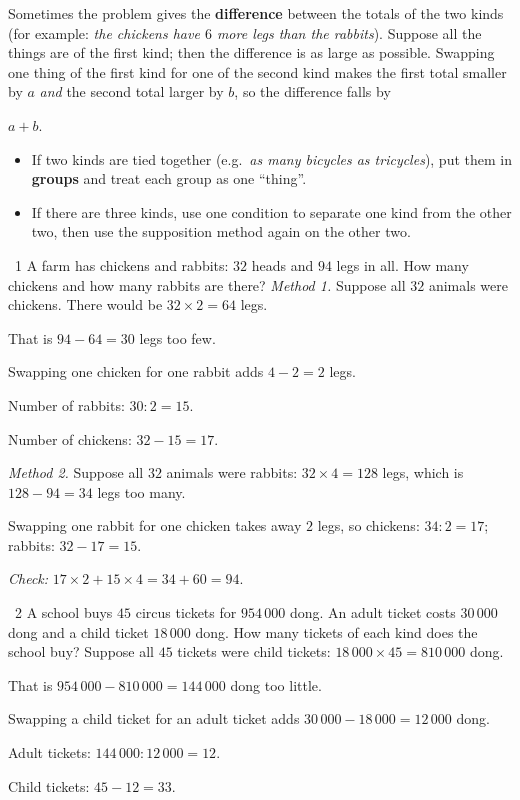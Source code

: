 \begin{knowbox}
Sometimes the problem gives the \textbf{difference} between the totals of the two kinds (for example: \emph{the chickens have $6$ more legs than the rabbits}). Suppose all the things are of the first kind; then the difference is as large as possible. Swapping one thing of the first kind for one of the second kind makes the first total smaller by $a$ \emph{and} the second total larger by $b$, so the difference falls by
\begin{center}
$a+b$.
\end{center}
\end{knowbox}

\begin{knowbox}
\begin{itemize}[leftmargin=1.4em,itemsep=3pt]
\item If two kinds are tied together (e.g.\ \emph{as many bicycles as tricycles}), put them in \textbf{groups} and treat each group as one ``thing''.
\item If there are three kinds, use one condition to separate one kind from the other two, then use the supposition method again on the other two.
\end{itemize}
\end{knowbox}
\gap
\begin{exbox}{\ExWord\ 1}
A farm has chickens and rabbits: $32$ heads and $94$ legs in all. How many chickens and how many rabbits are there?
\guide
\emph{Method 1.} Suppose all $32$ animals were chickens. There would be $32\times2=64$ legs.\par
That is $94-64=30$ legs too few.\par
Swapping one chicken for one rabbit adds $4-2=2$ legs.\par
Number of rabbits: $30:2=15$.\par Number of chickens: $32-15=17$.\par
\emph{Method 2.} Suppose all $32$ animals were rabbits: $32\times4=128$ legs, which is $128-94=34$ legs too many.\par
Swapping one rabbit for one chicken takes away $2$ legs, so chickens: $34:2=17$; rabbits: $32-17=15$.\par
\emph{Check:} $17\times2+15\times4=34+60=94$.
\end{exbox}
\gap
\begin{exbox}{\ExWord\ 2}
A school buys $45$ circus tickets for $954\,000$ dong. An adult ticket costs $30\,000$ dong and a child ticket $18\,000$ dong. How many tickets of each kind does the school buy?
\guide
Suppose all $45$ tickets were child tickets: $18\,000\times45=810\,000$ dong.\par
That is $954\,000-810\,000=144\,000$ dong too little.\par
Swapping a child ticket for an adult ticket adds $30\,000-18\,000=12\,000$ dong.\par
Adult tickets: $144\,000:12\,000=12$.\par Child tickets: $45-12=33$.
\end{exbox}
